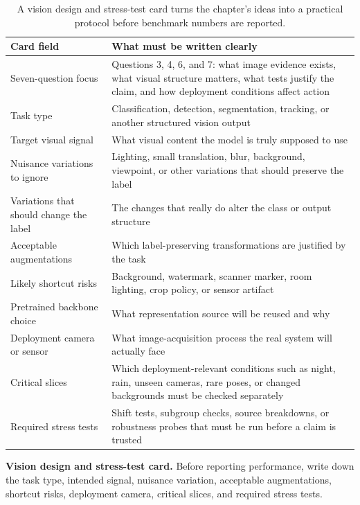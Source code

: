 \begin{table}[t]
\centering
\small
\setlength{\tabcolsep}{4pt}
\begin{tabular}{p{3.25cm}p{6.98cm}}
\toprule
Card field & What must be written clearly \\
\midrule
Seven-question focus & Questions 3, 4, 6, and 7: what image evidence exists, what visual structure matters, what tests justify the claim, and how deployment conditions affect action \\
Task type & Classification, detection, segmentation, tracking, or another structured vision output \\
Target visual signal & What visual content the model is truly supposed to use \\
Nuisance variations to ignore & Lighting, small translation, blur, background, viewpoint, or other variations that should preserve the label \\
Variations that should change the label & The changes that really do alter the class or output structure \\
Acceptable augmentations & Which label-preserving transformations are justified by the task \\
Likely shortcut risks & Background, watermark, scanner marker, room lighting, crop policy, or sensor artifact \\
Pretrained backbone choice & What representation source will be reused and why \\
Deployment camera or sensor & What image-acquisition process the real system will actually face \\
Critical slices & Which deployment-relevant conditions such as night, rain, unseen cameras, rare poses, or changed backgrounds must be checked separately \\
Required stress tests & Shift tests, subgroup checks, source breakdowns, or robustness probes that must be run before a claim is trusted \\
\bottomrule
\end{tabular}
\caption{A vision design and stress-test card turns the chapter's ideas into a practical protocol before benchmark numbers are reported.}
\label{tab:vision-stresstest-card}
\end{table}

\begin{thinkingtool}
\textbf{Vision design and stress-test card.} Before reporting performance, write down the task type, intended signal, nuisance variation, acceptable augmentations, shortcut risks, deployment camera, critical slices, and required stress tests.
\end{thinkingtool}

